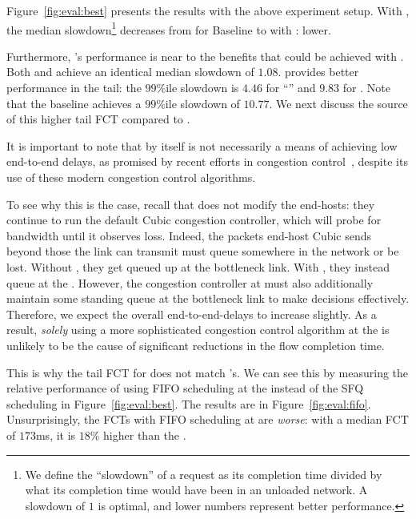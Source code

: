 Figure~\ref{fig:eval:best} presents the results with the above experiment setup.
With \name, the median 
slowdown\footnote{We define the ``slowdown'' of a request as its completion time divided by what its completion time would have been in an unloaded network. A slowdown of $1$ is optimal, and lower numbers represent better performance.} 
decreases from \overviewBenefitsBaselineMedian %
for Baseline to \overviewBenefitsBundlerMedian %
with \name: \overviewBenefitsBundlerMedianImprovement %
lower.

Furthermore, \name's performance is near to the benefits that could be achieved with \optimal.
Both \name and \optimal achieve an identical median slowdown of $1.08$.
\optimal provides better performance in the tail: the $99\%$ile slowdown is $4.46$ for ``\optimal'' and $9.83$ for \name.
Note that the baseline achieves a $99\%$ile slowdown of $10.77$.
We next discuss the source of this higher tail FCT compared to \optimal.

 It is important to note that \name by itself is not necessarily a means of achieving low end-to-end delays, as promised by recent efforts in congestion control~\cite{copa, nimbus}, despite its use of these modern congestion control algorithms.

To see why this is the case, recall that \name does not modify the end-hosts: they continue to run the default Cubic congestion controller, which will probe for bandwidth until it observes loss.
Indeed, the packets end-host Cubic sends beyond those the link can transmit must queue somewhere in the network or be lost. Without \name, they get queued up at the bottleneck link.
With \name, they instead queue at the \inbox.
However, the congestion controller at \inbox must also additionally maintain some standing queue at the bottleneck link to make decisions effectively.
Therefore, we expect the overall end-to-end-delays to increase slightly.
As a result, \emph{solely} using a more sophisticated congestion control algorithm at the \name is unlikely to be the cause of significant reductions in the flow completion time.

This is why the tail FCT for \name does not match \optimal's.
We can see this by measuring the relative performance of using FIFO scheduling at the \name instead of the SFQ scheduling in Figure~\ref{fig:eval:best}.
The results are in Figure~\ref{fig:eval:fifo}. 
Unsurprisingly, the FCTs with FIFO scheduling at \name are \emph{worse}: with a median FCT of $173$ms, it is $18$\% higher than the \baseline. 


